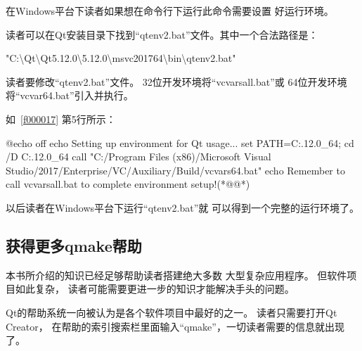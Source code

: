 在Windows平台下读者如果想在命令行下运行此命令需要设置
好运行环境。


读者可以在Qt安装目录下找到“qtenv2.bat”文件。其中一个合法路径是：
\begin{littlelongworld}
"C:\textbackslash{}Qt\textbackslash{}Qt5.12.0\textbackslash{}5.12.0\textbackslash{}msvc2017\underline{\hspace{0.5em}}64\textbackslash{}bin\textbackslash{}qtenv2.bat"
\end{littlelongworld}
\hspace*{\parindent}读者要修改“qtenv2.bat”文件。
32位开发环境将“vcvarsall.bat”或
64位开发环境将“vcvar64.bat”引入并执行。

如\filesourcenumbernameone\ \ref{f000017}
第5行所示：
\label{f000017}    %
\FloatBarrier                                  %
\begin{thebookfilesourceone}[escapeinside={(*@}{@*)},
caption=GoodLuck,
title=\filesourcenumbernameone \thefilesourcenumber
]
@echo off
echo Setting up environment for Qt usage...
set PATH=C:\5.12.0_64\bin;%
cd /D C:\5.12.0_64
call "C:/Program Files (x86)/Microsoft Visual Studio/2017/Enterprise/VC/Auxiliary/Build/vcvars64.bat"
echo Remember to call vcvarsall.bat to complete environment setup!(*@\marginpar[\hfill\setlength\fboxsep{2pt}\fbox{\footnotesize{\kaishu\parbox{1em}{\setlength{\baselineskip}{2pt}\filesourcenumbernameone}}\footnotesize{\thefilesourcenumber}}]{\setlength\fboxsep{2pt}\fbox{\footnotesize{\kaishu\parbox{1em}{\setlength{\baselineskip}{2pt}\filesourcenumbernameone}}\footnotesize{\thefilesourcenumber}}}@*)\end{thebookfilesourceone}          %
\addtocounter{lstlisting}{-1}   %

以后读者在Windows平台下运行“qtenv2.bat”就
可以得到一个完整的运行环境了。

\FloatBarrier
\subsection{
获得更多qmake帮助
}\label{ss000a10}


本书所介绍的知识已经足够帮助读者搭建绝大多数
大型复杂应用程序。
但软件项目如此复杂，
读者可能需要更进一步的知识才能解决手头的问题。

Qt的帮助系统一向被认为是各个软件项目中最好的之一。
读者只需要打开Qt Creator，
在帮助的索引搜索栏里面输入“qmake”，一切读者需要的信息就出现了。

